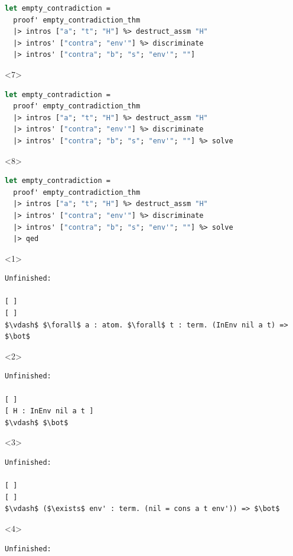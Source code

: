 \documentclass[aspectratio=169]{beamer}
\begin{document}
\begin{frame}[fragile]
\begin{overlayarea}{\linewidth}{3cm}
\begin{onlyenv}
\begin{lstlisting}[mathescape,language=OCaml,escapebegin=\color{codepurple}]
  let empty_contradiction =
  proof' empty_contradiction_thm
  |> intros ["a"; "t"; "H"] %> destruct_assm "H"
  |> intros' ["contra"; "env'"] %> discriminate
  |> intros' ["contra"; "b"; "s"; "env'"; ""]
\end{lstlisting}
\end{onlyenv}
  \begin{onlyenv}<7>
  \begin{lstlisting}[mathescape,language=OCaml,escapebegin=\color{codepurple}]
  let empty_contradiction =
  proof' empty_contradiction_thm
  |> intros ["a"; "t"; "H"] %> destruct_assm "H"
  |> intros' ["contra"; "env'"] %> discriminate
  |> intros' ["contra"; "b"; "s"; "env'"; ""] %> solve
\end{lstlisting}
\end{onlyenv}
  \begin{onlyenv}<8>
  \begin{lstlisting}[mathescape,language=OCaml,escapebegin=\color{codepurple}]
  let empty_contradiction =
  proof' empty_contradiction_thm
  |> intros ["a"; "t"; "H"] %> destruct_assm "H"
  |> intros' ["contra"; "env'"] %> discriminate
  |> intros' ["contra"; "b"; "s"; "env'"; ""] %> solve
  |> qed
\end{lstlisting}
\end{onlyenv}
\end{overlayarea}
\begin{overlayarea}{\linewidth}{2cm}
  \begin{onlyenv}<1>
  \begin{lstlisting}[mathescape]
Unfinished:

[ ]
[ ]
$\vdash$ $\forall$ a : atom. $\forall$ t : term. (InEnv nil a t) => $\bot$
\end{lstlisting}
\end{onlyenv}
  \begin{onlyenv}<2>
  \begin{lstlisting}[mathescape]
Unfinished:

[ ]
[ H : InEnv nil a t ]
$\vdash$ $\bot$
\end{lstlisting}
\end{onlyenv}
  \begin{onlyenv}<3>
  \begin{lstlisting}[mathescape]
Unfinished:

[ ]
[ ]
$\vdash$ ($\exists$ env' : term. (nil = cons a t env')) => $\bot$
\end{lstlisting}
\end{onlyenv}
  \begin{onlyenv}<4>
  \begin{lstlisting}[mathescape]
Unfinished:


\end{lstlisting}
\end{onlyenv}
\end{overlayarea}
\end{frame}
\end{document}
